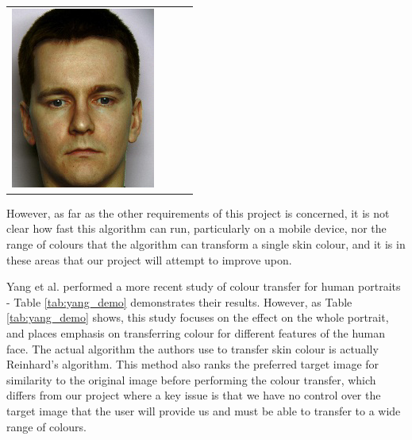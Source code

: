 \begin{longtable}{|N||c|c|c|}
\begin{minipage}{.29\textwidth}
    \includegraphics[width=\textwidth,height=\textheight,keepaspectratio]{images/seo_result1}
  \end{minipage} \\
\end{longtable}

However, as far as the other requirements of this project is concerned, it is not clear how fast this algorithm can run, particularly on a mobile device, nor the range of colours that the algorithm can transform a single skin colour, and it is in these areas that our project will attempt to improve upon.

Yang et al. performed a more recent study of colour transfer for human portraits \cite{yang_2017_semantic} - Table \ref{tab:yang_demo} demonstrates their results. However, as Table \ref{tab:yang_demo} shows, this study focuses on the effect on the whole portrait, and places emphasis on transferring colour for different features of the human face. The actual algorithm the authors use to transfer skin colour is actually Reinhard's algorithm. This method also ranks the preferred target image for similarity to the original image before performing the colour transfer, which differs from our project where a key issue is that we have no control over the target image that the user will provide us and must be able to transfer to a wide range of colours. 

